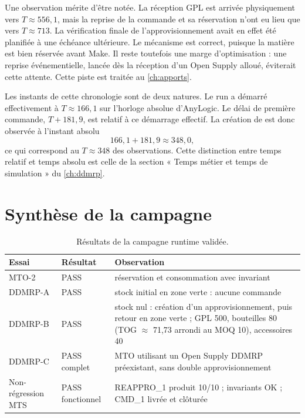 

Une observation mérite d'être notée. La réception GPL est arrivée physiquement vers $T \approx 556{,}1$,
mais la reprise de la commande et sa réservation n'ont eu lieu que vers $T \approx 713$. La vérification
finale de l'approvisionnement avait en effet été planifiée à une échéance ultérieure. Le mécanisme est
correct, puisque la matière est bien réservée avant Make. Il reste toutefois une marge d'optimisation :
une reprise événementielle, lancée dès la réception d'un Open Supply alloué, éviterait cette attente.
Cette piste est traitée au \cref{ch:apports}.

Les instants de cette chronologie sont de deux natures. Le run a démarré effectivement à $T \approx 166{,}1$
sur l'horloge absolue d'AnyLogic. Le délai de première commande, $T+181{,}9$, est relatif à ce démarrage
effectif. La création de  est donc observée à l'instant absolu
\[
166{,}1 + 181{,}9 \approx 348{,}0,
\]
ce qui correspond au $T \approx 348$ des observations. Cette distinction entre temps relatif et temps
absolu est celle de la section « Temps métier et temps de simulation » du \cref{ch:ddmrp}.

\section{Synthèse de la campagne}

\begin{table}[H]
  \centering
  \caption{Résultats de la campagne runtime validée.}\label{tab:campagne}
  \begin{tabularx}{\textwidth}{@{}L{3.2cm}L{2.4cm}Y@{}}
    \toprule
    Essai & Résultat & Observation \\
    \midrule
    MTO-2 & PASS & réservation et consommation avec invariant \\
    DDMRP-A & PASS & stock initial en zone verte : aucune commande \\
    DDMRP-B & PASS & stock nul : création d'un approvisionnement, puis retour en zone verte ;
      GPL 500, bouteilles 80 (TOG $\approx$ 71{,}73 arrondi au MOQ 10), accessoires 40 \\
    DDMRP-C & PASS complet & MTO utilisant un Open Supply DDMRP préexistant, sans double approvisionnement \\
    Non-régression MTS & PASS fonctionnel & REAPPRO\_1 produit 10/10 ; invariants OK ; CMD\_1 livrée et clôturée \\
    \bottomrule
  \end{tabularx}
\end{table}

